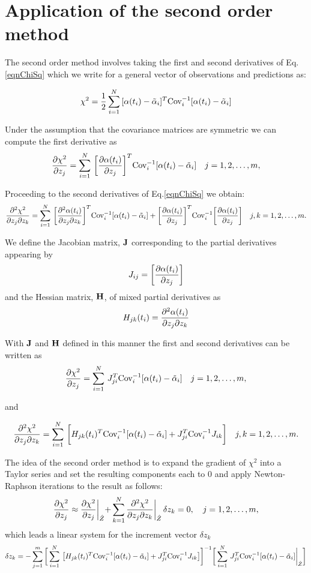 \section{Application of the second order method}

The second order method involves taking the first and second derivatives of Eq.\eqref{eqnChiSq} which we write for a general vector of observations and predictions as:

\begin{align*}\chi^2 = {1\over2}\sum_{i=1}^N\, [\alpha(t_i) - \tilde\alpha_i]^T \hbox{Cov}_i^{-1}[\alpha(t_i) - \tilde\alpha_i]\end{align*}

Under the assumption that the covariance matrices are symmetric we can compute the first derivative as
$${\partial \chi^2\over \partial z_j}  = \sum_{i=1}^N\, \bigg[{\partial\alpha(t_i)\over\partial z_j}\bigg]^T \hbox{Cov}_i^{-1}[\alpha(t_i) - \tilde\alpha_i] \quad j =1,2,\hdots, m,$$

Proceeding to the second derivatives of Eq.\eqref{eqnChiSq} we obtain:
$${\partial^2 \chi^2\over \partial z_j\partial z_k}  = 
\sum_{i=1}^N\, \bigg[{\partial^2\alpha(t_i)\over\partial z_j\partial z_k}\bigg]^T \hbox{Cov}_i^{-1}[\alpha(t_i) - \tilde\alpha_i]  + \bigg[{\partial\alpha(t_i)\over\partial z_j}\bigg]^T \hbox{Cov}_i^{-1}\bigg[{\partial\alpha(t_i)\over\partial z_j}\bigg]
\quad j,k  =1,2,\hdots, m.$$

We define the Jacobian matrix, $\bf J$ corresponding to the partial derivatives appearing by 
$$J_{ij} = \bigg[{\partial\alpha(t_i)\over\partial z_j}\bigg]$$and the Hessian matrix, $\bf H$, of mixed partial derivatives as 
$$H_{jk}(t_i) = {\partial^2\alpha(t_i)\over\partial z_j\partial z_k}$$

With $\bf J$ and $\bf H$ defined in this manner the first and second derivatives can be written as 
$${\partial \chi^2\over \partial z_j}  = \sum_{i=1}^N\, J_{ji}^T \hbox{Cov}_i^{-1}[\alpha(t_i) - \tilde\alpha_i] \quad j =1,2,\hdots, m,$$

and 

$${\partial^2 \chi^2\over \partial z_j\partial z_k}  = 
\sum_{i=1}^N\, \bigg[H_{jk}(t_i)^T \hbox{Cov}_i^{-1}[\alpha(t_i) - \tilde\alpha_i]  + J_{ji}^T \hbox{Cov}_i^{-1}J_{ik} \bigg] \quad j,k  =1,2,\hdots, m.$$

The idea of the second order method is to expand the gradient of $\chi^2$ into a Taylor series and set the resulting components each to 0 and apply Newton-Raphson iterations to the result as follows: 
$${\partial \chi^2\over \partial z_j} \approx {\partial \chi^2\over \partial z_j} \biggl|_{\hat{Z}} + \sum_{k=1}^N  {\partial^2 \chi^2\over \partial z_j \partial z_k} \biggl|_{\hat{Z}}\,\delta z_k = 0,\quad j =1,2,\hdots, m,$$
which leads a linear system for the increment vector $\delta z_k$
$$\delta z_k =  -\sum_{j=1}^m\bigg[\sum_{i=1}^N\, \big[H_{jk}(t_i)^T \hbox{Cov}_i^{-1}[\alpha(t_i) - \tilde\alpha_i]  + J_{ji}^T \hbox{Cov}_i^{-1}J_{ik} \big] \bigg]^{-1} \bigg[ \sum_{i=1}^N\, J_{ji}^T \hbox{Cov}_i^{-1}[\alpha(t_i) - \tilde\alpha_i]  \biggl|_{\hat{Z}}\bigg]$$

